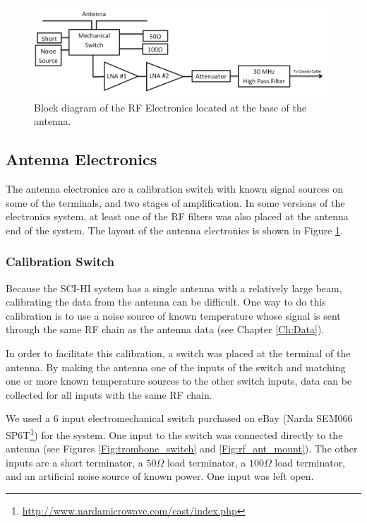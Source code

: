 \begin{figure}[htb]
\begin{center}
\includegraphics[width=0.9\linewidth]{SCIHI_system/figures/antenna_rf_block_diagram.png}
\caption{Block diagram of the RF Electronics located at the base of the antenna.}
\label{Fig:antenna_RF_block_diagram}
\end{center}
\end{figure}


\subsection{Antenna Electronics}

The antenna electronics are a calibration switch with known signal sources on some of the terminals, and two stages of amplification. In some versions of the electronics system, at least one of the RF filters was also placed at the antenna end of the system. The layout of the antenna electronics is shown in Figure \ref{Fig:antenna_RF_block_diagram}. 

\subsubsection{Calibration Switch} \label{Sec:switch}

Because the SCI-HI system has a single antenna with a relatively large beam, calibrating the data from the antenna can be difficult. One way to do this calibration is to use a noise source of known temperature whose signal is sent through the same RF chain as the antenna data (see Chapter \ref{Ch:Data}). 

In order to facilitate this calibration, a switch was placed at the terminal of the antenna. By making the antenna one of the inputs of the switch and matching one or more known temperature sources to the other switch inputs, data can be collected for all inputs with the same RF chain. 

We used a 6 input electromechanical switch purchased on eBay (Narda SEM066 SP6T\footnote{\url{http://www.nardamicrowave.com/east/index.php}}) for the system. One input to the switch was connected directly to the antenna (see Figures \ref{Fig:trombone_switch} and \ref{Fig:rf_ant_mount}). The other inputs are a short terminator, a $50 \Omega$ load terminator, a $100 \Omega$ load terminator, and an artificial noise source of known power. One input was left open. 

